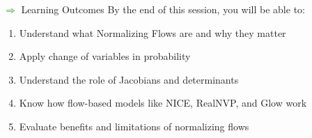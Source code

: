 \begin{frame}[allowframebreaks]{\textcolor{green}{$\Rightarrow$} Learning Outcomes}
    By the end of this session, you will be able to:
    \begin{enumerate}
        \setlength{\itemsep}{-0.1em}
        \item Understand what Normalizing Flows are and why they matter
        \item Apply change of variables in probability
        \item Understand the role of Jacobians and determinants
        \item Know how flow-based models like NICE, RealNVP, and Glow work
        \item Evaluate benefits and limitations of normalizing flows
    \end{enumerate}
\end{frame}